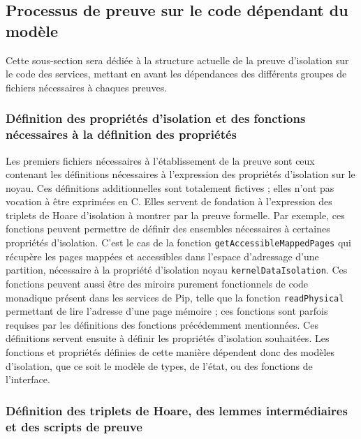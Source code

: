 		\subsection{Processus de preuve sur le code dépendant du modèle}
		\label{sec:dependant_code}

			Cette sous-section sera dédiée à la structure actuelle de la preuve d'isolation sur le code des services, mettant en avant les dépendances des différents groupes de fichiers nécessaires à chaques preuves.

			\subsubsection{Définition des propriétés d'isolation et des fonctions nécessaires à la définition des propriétés}

			Les premiers fichiers nécessaires à l'établissement de la preuve sont ceux contenant les définitions nécessaires à l'expression des propriétés d'isolation sur le noyau. Ces définitions additionnelles sont totalement fictives ; elles n'ont pas vocation à être exprimées en C. Elles servent de fondation à l'expression des triplets de Hoare d'isolation à montrer par la preuve formelle. Par exemple, ces fonctions peuvent permettre de définir des ensembles nécessaires à certaines propriétés d'isolation. C'est le cas de la fonction \texttt{getAccessibleMappedPages} qui récupère les pages mappées et accessibles dans l'espace d'adressage d'une partition, nécessaire à la propriété d'isolation noyau \texttt{kernelDataIsolation}. Ces fonctions peuvent aussi être des miroirs purement fonctionnels de code monadique présent dans les services de Pip, telle que la fonction \texttt{readPhysical} permettant de lire l'adresse d'une page mémoire ; ces fonctions sont parfois requises par les définitions des fonctions précédemment mentionnées. Ces définitions servent ensuite à définir les propriétés d'isolation souhaitées. Les fonctions et propriétés définies de cette manière dépendent donc des modèles d'isolation, que ce soit le modèle de types, de l'état, ou des fonctions de l'interface.

			\subsubsection{Définition des triplets de Hoare, des lemmes intermédiaires et des scripts de preuve}

